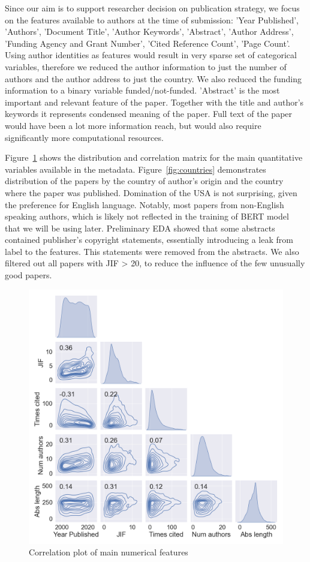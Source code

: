 \documentclass[11pt]{article}
\begin{document}
Since our aim is to support researcher decision on publication strategy, we focus on the features available to authors at the time of submission: 'Year Published', 'Authors', 'Document Title', 'Author Keywords', 'Abstract', 'Author Address', 'Funding Agency and Grant Number', 'Cited Reference Count', 'Page Count'. Using author identities as features would result in very sparse set of categorical variables, therefore we reduced the author information to just the number of authors and the author address to just the country. We also reduced the funding information to a binary variable funded/not-funded. 'Abstract' is the most important and relevant feature of the paper. Together with the title and author's keywords it represents condensed meaning of the paper. Full text of the paper would have been a lot more information reach, but would also require significantly more computational resources. 
 
Figure~\ref{fig:paiplot} shows the distribution and correlation matrix for the main quantitative variables available in the metadata. Figure~\ref{fig:countries} demonstrates distribution of the papers by the country of author's origin and the country where the paper was published. Domination of the USA is not surprising, given the preference for English language. Notably, most papers from non-English speaking authors, which is likely not reflected in the training of BERT model that we will be using later. Preliminary EDA showed that some abstracts contained publisher's copyright statements, essentially introducing a leak from label to the features. This statements were removed from the abstracts. We also filtered out all papers with JIF > 20, to reduce the influence of the few unusually good papers.
\begin{figure}
	\includegraphics[width= \columnwidth]{./Images/Pairplot.png}
	\caption{Correlation plot of main numerical features}
	\label{fig:paiplot}
\end{figure}
\end{document}
